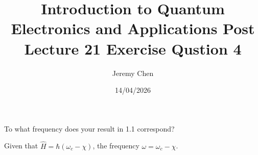 \documentclass[10pt,letterpaper]{article}
\title{Introduction to Quantum Electronics and Applications Post Lecture 21 Exercise Qustion 4}
\author{Jeremy Chen}
\date{14/04/2026}
\begin{document}
	\maketitle
	
\noindent To what frequency does your result in 1.1 correspond?

\color{violet}
Given that $\hat{H} = \hbar(\omega_{c} - \chi)$, the frequency $\omega = \omega_{c} - \chi$. 
\color{black}	
	
\end{document}
